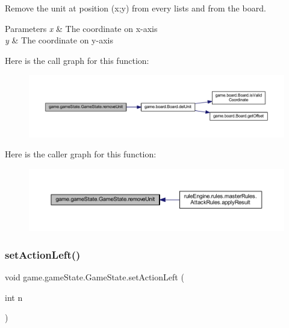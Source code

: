 Remove the unit at position (x;y) from every lists and from the board.


\begin{DoxyParams}{Parameters}
{\em x} & The coordinate on x-\/axis \\
\hline
{\em y} & The coordinate on y-\/axis \\
\hline
\end{DoxyParams}
Here is the call graph for this function\+:
\nopagebreak
\begin{figure}[H]
\begin{center}
\leavevmode
\includegraphics[width=350pt]{classgame_1_1game_state_1_1_game_state_a671269ff7143ada95e467bc922be519e_cgraph}
\end{center}
\end{figure}
Here is the caller graph for this function\+:
\nopagebreak
\begin{figure}[H]
\begin{center}
\leavevmode
\includegraphics[width=350pt]{classgame_1_1game_state_1_1_game_state_a671269ff7143ada95e467bc922be519e_icgraph}
\end{center}
\end{figure}
\mbox{\label{classgame_1_1game_state_1_1_game_state_afdbab1b9e1116bfa025e589355bcc0fe}} 
\subsubsection{\texorpdfstring{set\+Action\+Left()}{setActionLeft()}}
{\footnotesize\ttfamily void game.\+game\+State.\+Game\+State.\+set\+Action\+Left (\begin{DoxyParamCaption}\item[{int}]{n }\end{DoxyParamCaption})\hspace{0.3cm}{\ttfamily [inline]}}


